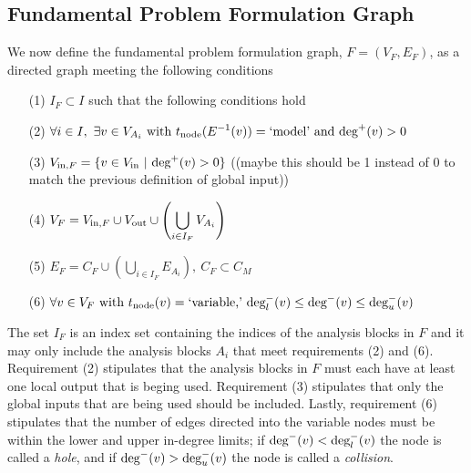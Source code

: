 \subsection{Fundamental Problem Formulation Graph}
We now define the fundamental problem formulation graph, $F=(V_F,E_F)$, as a directed graph meeting the following conditions
\begin{enumerate}
\item[(1)] $\displaystyle{I_F \subset I}$ such that the following conditions hold
\item[(2)] $\displaystyle{ \forall i \in I, \ \exists v \in V_{A_i} \textrm{ with } t_\textrm{node}(E^{-1}(v))=\textrm{`model'} \textrm{ and } \textrm{deg}^+(v)>0 }$
\item[(3)] $\displaystyle{V_{\textrm{in},F} = \{v \in V_\textrm{in}  \ | \ \textrm{deg}^+(v) > 0\} }$ ((maybe this should be 1 instead of 0 to match the previous definition of global input))
\item[(4)] $\displaystyle{V_F = V_{\textrm{in},F} \cup V_\textrm{out} \cup \left( \bigcup_{i \in I_F} V_{A_i} \right)}$
\item[(5)] $\displaystyle{E_F = C_F \cup \left( \bigcup_{i \in I_F} E_{A_i} \right), \ C_F \subset C_M}$
\item[(6)] $\displaystyle{\forall v \in V_F \textrm{ with } t_\textrm{node}(v) = \textrm{`variable,'} \  \textrm{deg}_l^-(v) \leq \textrm{deg}^-(v) \leq \textrm{deg}_u^-(v)}$
\end{enumerate}
The set $I_F$ is an index set containing the indices of the analysis blocks in $F$ and it may only include the analysis blocks $A_i$ that meet requirements (2) and (6). Requirement (2) stipulates that the analysis blocks in $F$ must each have at least one local output that is beging used. Requirement (3) stipulates that only the global inputs that are being used should be included. Lastly, requirement (6) stipulates that the number of edges directed into the variable nodes must be within the lower and upper in-degree limits; if $\textrm{deg}^-(v) < \textrm{deg}_l^-(v)$ the node is called a \emph{hole}, and if $\textrm{deg}^-(v) > \textrm{deg}_u^-(v)$ the node is called a \emph{collision}. 

